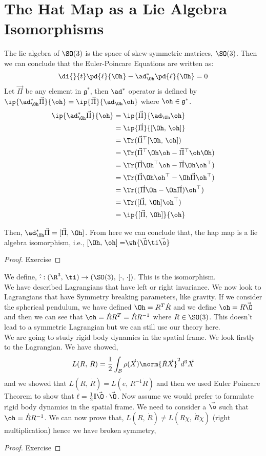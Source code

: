 
\section{The Hat Map as a Lie Algebra Isomorphisms}
The lie algebra of $\SO(3)$ is the space of skew-symmetric matrices, $\SO(3)$. Then we can conclude that the Euler-Poincare Equations are written as:
$$ \di {}{t} \pd{\ell}{\Oh} - \ad^*_{\Oh}\pd{\ell}{\Oh} = 0 $$
Let $\vec\Pi$ be any element in $\mathfrak{g}^*$, then $\ad^*$ operator is defined by $\ip{\ad_{\Oh}^*\vec\Pi}{\oh} = \ip{\vec\Pi}{\ad_{\Oh}{\oh}}$ where $\oh \in \mathfrak{g}^*$.
{\color{red} \begin{align*}
  \ip{\ad_{\Oh}^*\vec\Pi}{\oh} &= \ip{\vec\Pi}{\ad_{\Oh}{\oh}}\\
  &= \ip{\vec\Pi}{[\Oh,\,\oh]}\\
  &= \Tr(\vec\Pi^\top [\Oh,\,\oh])\\
  &= \Tr(\vec\Pi^\top \Oh\oh - \vec\Pi^\top\oh\Oh)\\
  &= \Tr(\vec\Pi\Oh^\top\oh - \vec\Pi\Oh\oh^\top)\\
  &= \Tr(\vec\Pi\Oh\oh^\top - \Oh\vec\Pi\oh^\top) \\
  &= \Tr((\vec\Pi\Oh - \Oh\vec\Pi)\oh^\top) \\
  &= \Tr([\vec\Pi,\,\Oh]\oh^\top) \\
  &= \ip{[\vec\Pi,\,\Oh]}{\oh}
\end{align*} }

Then, $\ad^*_{\Oh}\vec\Pi = [\vec\Pi,\,\Oh]$. From here we can conclude that, the hap map is a lie algebra isomorphism, i.e., $ {[\Oh,\,\oh] = }\wh{\vec\O\ti\vec\o} $
\begin{proof}
  Exercise
\end{proof}
We define, $\hat{\cdot} : (\R^3,\, \ti) \to (\SO(3),\, [\cdot,\, \cdot])$. This is the isomorphism.\\

We have described Lagrangians that have left or right invariance. We now look to Lagrangians that have Symmetry breaking parameters, like gravity. If we consider the spherical pendulum, we have defined $\Oh = R^T\dot R$ and we define $\oh = R\vec\O$ and then we can see that $\oh = \dot R R^T = \dot R R^{-1}$ where $R \in \SO(3)$. This doesn't lead to a symmetric Lagrangian but we can still use our theory here. \\

We are going to study rigid body dynamics in the spatial frame. We look firstly to the Lagrangian. We have showed,
$$ L(R,\,\dot R) = \frac{1}{2} \int_\mathcal{B} \rho(\vec X) \norm{\dot R \vec X}^2 d^3\vec X $$
and we showed that $L(R,\, \dot R) = L(e,\, R^{-1}\dot R)$ and then we used Euler Poincare Theorem to show that $\ell = \frac{1}{2}\mathbb{I}\vec\O \cdot \vec\O$. Now assume we would prefer to formulate rigid body dynamics in the spatial frame. We need to consider a $\vec\o$ such that $\oh = \dot R R^{-1}$. We can now prove that, $L(R,\,\dot R) \ne L(R\chi,\,\dot R\chi)$ (right multiplication) hence we have broken symmetry,
\begin{proof}
  Exercise
\end{proof}

